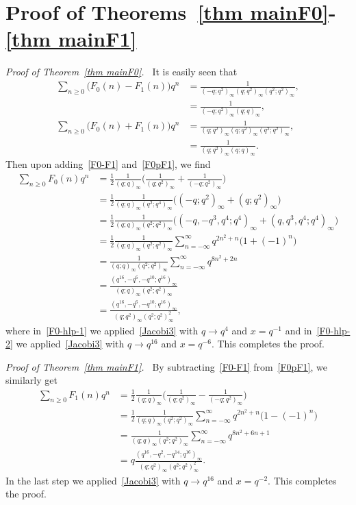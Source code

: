 \documentclass{amsart}
\numberwithin{equation}{section}
\theoremstyle{definition}
\newcommand{\fr}{\frac}
\begin{document}
\section{Proof of Theorems~\ref{thm mainF0}-\ref{thm mainF1}}\label{sec proof F01}
%
\emph{Proof of Theorem~\ref{thm mainF0}.\ }
It is easily seen that
\begin{align}
\sum_{n\geq 0} \big(F_0(n)-F_1(n)\big) q^n &= \fr{1}{(-q;q^2)_\infty (q;q^2)_\infty (q^2;q^2)_\infty}, \nonumber \\
&=\fr{1}{(-q;q^2)_\infty (q;q)_\infty}, \label{F0-F1} \\
\sum_{n\geq 0} \big(F_0(n)+F_1(n)\big) q^n &= \fr{1}{(q;q^2)_\infty (q;q^2)_\infty (q^2;q^2)_\infty}, \nonumber \\
&= \fr{1}{(q;q^2)_\infty (q;q)_\infty}. \label{F0pF1}
\end{align}
Then upon adding~\eqref{F0-F1} and~\eqref{F0pF1}, we find
\begin{align}
\sum_{n\geq 0} F_0(n) q^n &= \fr{1}{2}\fr{1}{(q;q)_\infty} \Big(\fr{1}{(q;q^2)_\infty} + \fr{1}{(-q;q^2)_\infty} \Big) \nonumber \\
&=\fr{1}{2}\fr{1}{(q;q)_\infty (q^2;q^4)_\infty} \big( (-q;q^2)_\infty + (q;q^2)_\infty \big) \nonumber \\
&=\fr{1}{2}\fr{1}{(q;q)_\infty (q^2;q^2)_\infty} \big( (-q,-q^3,q^4;q^4)_\infty + (q,q^3,q^4;q^4)_\infty \big) \nonumber \\
&=\fr{1}{2}\fr{1}{(q;q)_\infty (q^2;q^2)_\infty} \sum_{n=-\infty}^\infty q^{2n^2+n} \big( 1+(-1)^n \big) \label{F0-hlp-1}\\
&= \fr{1}{(q;q)_\infty (q^2;q^2)_\infty} \sum_{n=-\infty}^\infty q^{8n^2 + 2n} \nonumber \\
&= \fr{(q^{16},-q^6,-q^{10};q^{16})_\infty}{(q;q)_\infty (q^2;q^2)_\infty} \label{F0-hlp-2} \\
&= \fr{(q^{16},-q^6,-q^{10};q^{16})_\infty}{(q;q^2)_\infty (q^2;q^2)_\infty^2}, \nonumber
\end{align}
where in~\eqref{F0-hlp-1} we applied~\eqref{Jacobi3} with $q\to q^4$ and $x=q^{-1}$ and
in~\eqref{F0-hlp-2} we applied~\eqref{Jacobi3} with $q\to q^{16}$ and $x= q^{-6}$. This completes the proof.

\emph{Proof of Theorem~\ref{thm mainF1}.\ }
By subtracting~\eqref{F0-F1} from~\eqref{F0pF1}, we similarly get
\begin{align*}
\sum_{n\geq 0} F_1(n) q^n &= \fr{1}{2}\fr{1}{(q;q)_\infty} \Big(\fr{1}{(q;q^2)_\infty} - \fr{1}{(-q;q^2)_\infty} \Big) \\
&=\fr{1}{2}\fr{1}{(q;q)_\infty (q^2;q^2)_\infty} \sum_{n=-\infty}^\infty q^{2n^2+n} \big( 1-(-1)^n \big) \\
&= \fr{1}{(q;q)_\infty (q^2;q^2)_\infty} \sum_{n=-\infty}^\infty q^{8n^2 + 6n+1}  \\
&= q\fr{(q^{16},-q^2,-q^{14};q^{16})_\infty}{(q;q^2)_\infty (q^2;q^2)_\infty^2}.
\end{align*}
In the last step we applied~\eqref{Jacobi3} with $q\to q^{16}$ and $x=q^{-2}$.
This completes the proof.
%
\end{document}
